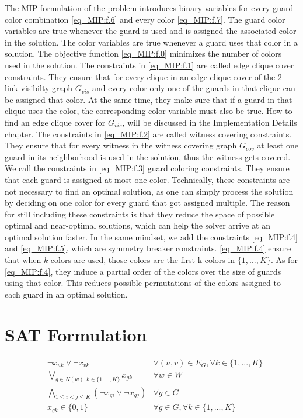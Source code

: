 The MIP formulation of the problem introduces binary variables for every guard color combination \cref{eq_MIP:f.6} and every color \cref{eq_MIP:f.7}. The guard color variables are true whenever the guard is used and is assigned the associated color in the solution. The color variables are true whenever a guard uses that color in a solution. The objective function \cref{eq_MIP:f.0} minimizes the number of colors used in the solution. The constraints in \cref{eq_MIP:f.1} are called edge clique cover constraints. They ensure that for every clique in an edge clique cover of the 2-link-visibilty-graph $G_{vis}$ and every color only one of the guards in that clique can be assigned that color. At the same time, they make sure that if a guard in that clique uses the color, the corresponding color variable must also be true. How to find an edge clique cover for $G_{vis}$, will be discussed in the Implementation Details chapter. The constraints in \cref{eq_MIP:f.2} are called witness covering constraints. They ensure that for every witness in the witness covering graph $G_{cov}$ at least one guard in its neighborhood is used in the solution, thus the witness gets covered. We call the constraints in \cref{eq_MIP:f.3} guard coloring constraints. They ensure that each guard is assigned at most one color. Technically, these constraints are not necessary to find an optimal solution, as one can simply process the solution by deciding on one color for every guard that got assigned multiple. The reason for still including these constraints is that they reduce the space of possible optimal and near-optimal solutions, which can help the solver arrive at an optimal solution faster. In the same mindset, we add the constraints \cref{eq_MIP:f.4} and \cref{eq_MIP:f.5}, which are symmetry breaker constraints. \cref{eq_MIP:f.4} ensure that when $k$ colors are used, those colors are the first k colors in $\{1,...,K\}$. As for \cref{eq_MIP:f.4}, they induce a partial order of the colors over the size of guards using that color. This reduces possible permutations of the colors assigned to each guard in an optimal solution.

\section{SAT Formulation}

\begin{align}
\label{eq_SAT:f.0}&\lnot x_{uk} \lor \lnot x_{vk} & \forall (u,v)\in E_{G}, \forall k\in \{1,...,K\}\\
\label{eq_SAT:f.1}&\bigvee_{g\in N(w), k\in \{1,...,K\}}x_{gk} & \forall w\in W\\
\label{eq_SAT:f.2}&\bigwedge_{1 \leq i < j \leq K} (\lnot x_{gi} \lor \lnot x_{gj}) & \forall g\in G\\
\label{eq:_SATf.3}& x_{gk} \in \{0,1\} & \forall g\in G, \forall k\in \{1,...,K\}
\end{align}

